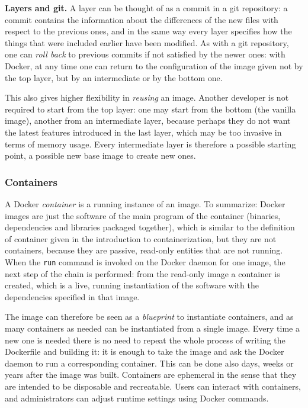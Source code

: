 \begin{notebox}
	\textbf{Layers and git.} A layer can be thought of as a commit in a git repository: a commit contains the information about the differences of the new files with respect to the previous ones, and in the same way every layer specifies how the things that were included earlier have been modified. As with a git repository, one can \emph{roll back} to previous commits if not satisfied by the newer ones: with Docker, at any time one can return to the configuration of the image given not by the top layer, but by an intermediate or by the bottom one.

	\medskip
	This also gives higher flexibility in \emph{reusing} an image. Another developer is not required to start from the top layer: one may start from the bottom (the vanilla image), another from an intermediate layer, because perhaps they do not want the latest features introduced in the last layer, which may be too invasive in terms of memory usage. Every intermediate layer is therefore a possible starting point, a possible new base image to create new ones.
\end{notebox}

\subsubsection*{Containers}

A Docker \emph{container} is a running instance of an image. To summarize: Docker images are just the software of the main program of the container (binaries, dependencies and libraries packaged together), which is similar to the definition of container given in the introduction to containerization, but they are not containers, because they are passive, read-only entities that are not running. When the \texttt{run} command is invoked on the Docker daemon for one image, the next step of the chain is performed: from the read-only image a container is created, which is a live, running instantiation of the software with the dependencies specified in that image.

The image can therefore be seen as a \emph{blueprint} to instantiate containers, and as many containers as needed can be instantiated from a single image. Every time a new one is needed there is no need to repeat the whole process of writing the Dockerfile and building it: it is enough to take the image and ask the Docker daemon to run a corresponding container. This can be done also days, weeks or years after the image was built. Containers are ephemeral in the sense that they are intended to be disposable and recreatable. Users can interact with containers, and administrators can adjust runtime settings using Docker commands.

